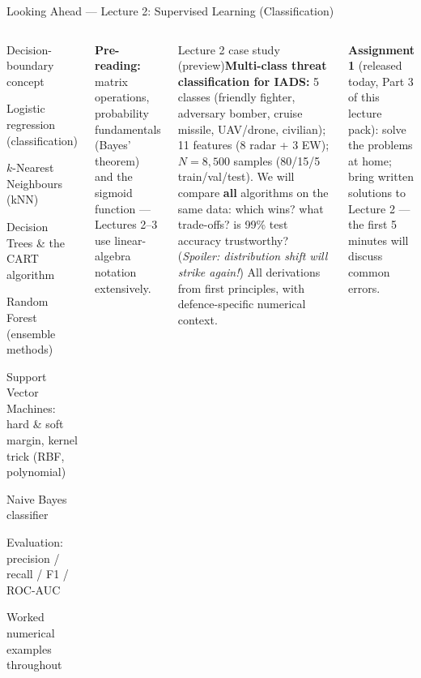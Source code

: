 \documentclass[aspectratio=169,10pt,t]{beamer}
\begin{document}
\begin{frame}{Looking Ahead --- Lecture 2: Supervised Learning (Classification)}
\begin{columns}[T]
\begin{tl}\item Decision-boundary concept\item Logistic regression (classification)\item $k$-Nearest Neighbours (kNN)\item Decision Trees \& the CART algorithm\item Random Forest (ensemble methods)\item Support Vector Machines: hard \& soft margin, kernel trick (RBF, polynomial)\item Naive Bayes classifier\item Evaluation: precision / recall / F1 / ROC-AUC\item Worked numerical examples throughout\end{tl}
\begin{ibox}\scriptsize\textbf{Pre-reading:} matrix operations, probability fundamentals (Bayes' theorem) and the sigmoid function --- Lectures 2--3 use linear-algebra notation extensively.\end{ibox}
\begin{cbox}{Lecture 2 case study (preview)}\scriptsize \textbf{Multi-class threat classification for IADS:} 5 classes (friendly fighter, adversary bomber, cruise missile, UAV/drone, civilian); 11 features (8 radar + 3 EW); $N=8{,}500$ samples (80/15/5 train/val/test). We will compare \textbf{all} algorithms on the same data: which wins? what trade-offs? is 99\% test accuracy trustworthy? (\emph{Spoiler: distribution shift will strike again!}) All derivations from first principles, with defence-specific numerical context.\end{cbox}
\begin{rbox}\scriptsize\textbf{Assignment 1} (released today, Part 3 of this lecture pack): solve the problems at home; bring written solutions to Lecture 2 --- the first 5 minutes will discuss common errors.\end{rbox}
\end{columns}
\end{frame}
\end{document}
